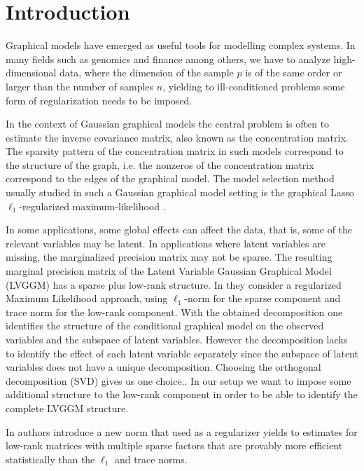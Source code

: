 \section{Introduction}
\label{intro}


Graphical models have emerged as useful tools for modelling complex systems. In many fields such as genomics and finance among others, we have to analyze high-dimensional data, where the dimension of the sample $p$ is of the same order or larger than the number of samples $n$, yielding to ill-conditioned problems some form of regularization needs to be imposed.

In the context of Gaussian graphical models the central problem is often to estimate the inverse covariance matrix, also known as the concentration matrix. The sparsity pattern of the concentration matrix in such models correspond to the structure of the graph, i.e. the nonzeros of the concentration matrix correspond to the edges of the graphical model. The model selection method usually studied in such a Gaussian graphical model setting is the graphical Lasso $\ell_1$-regularized maximum-likelihood \citep{friedman2008sparse,yuan2007model,banerjee2008model}.

In some applications, some global effects can affect the data, that is, some of the relevant variables may be latent. In applications where latent variables are missing, the marginalized precision matrix may not be sparse. The resulting marginal precision matrix of the Latent Variable Gaussian Graphical Model (LVGGM) has a sparse plus low-rank structure. In \citet{chandrasekaran2010} they consider a regularized Maximum Likelihood approach, using $\ell_1$-norm for the sparse component and trace norm for the low-rank component. With the obtained decomposition one identifies the structure of the conditional graphical model on the observed variables and the subspace of latent variables. However the decomposition lacks to identify the effect of each latent variable separately since the subspace of latent variables does not have a unique decomposition. Choosing the orthogonal decomposition (SVD) gives us one choice.. In our setup we want to impose some additional structure to the low-rank component in order to be able to identify the complete LVGGM structure.  

In \citet{richard2014tight} authors introduce a new norm that used as a regularizer yields to  estimates for low-rank matrices with multiple sparse factors that are provably more efficient statistically than the $\ell_1$ and trace norms.

